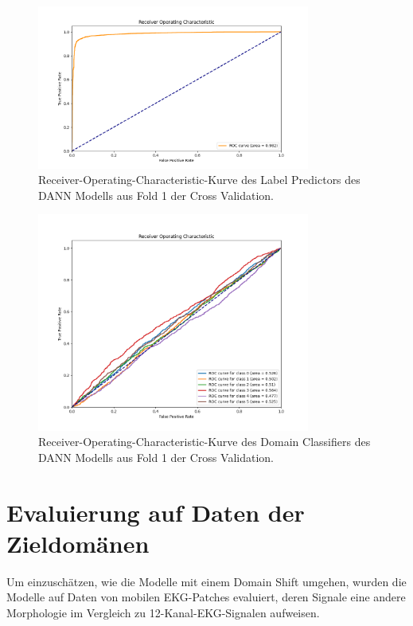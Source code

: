 \begin{figure}[!ht]%
\centering
	\includegraphics[width=0.8\textwidth]{./Bilder/DANN_roc_label_fold1.png}
\caption[Label Predictor ROC-Kurve]{Receiver-Operating-Characteristic-Kurve des Label Predictors des \gls{DANN} Modells aus Fold 1 der Cross Validation.} 
\label{fig:DANN_label_roc}
\end{figure}

\begin{figure}[!ht]%
\centering
	\includegraphics[width=0.8\textwidth]{./Bilder/DANN_roc_domain_fold1.png}
\caption[Domain Classifier ROC-Kurven]{Receiver-Operating-Characteristic-Kurve des Domain Classifiers des \gls{DANN} Modells aus Fold 1 der Cross Validation. } 
\label{fig:DANN_label_roc}
\end{figure}



\section{Evaluierung auf Daten der Zieldomänen}\label{sec:zieldomäne}

Um einzuschätzen, wie die Modelle mit einem Domain Shift umgehen, wurden die Modelle auf Daten von mobilen \gls{EKG}-Patches evaluiert, deren Signale eine andere Morphologie im Vergleich zu 12-Kanal-\gls{EKG}-Signalen aufweisen.

